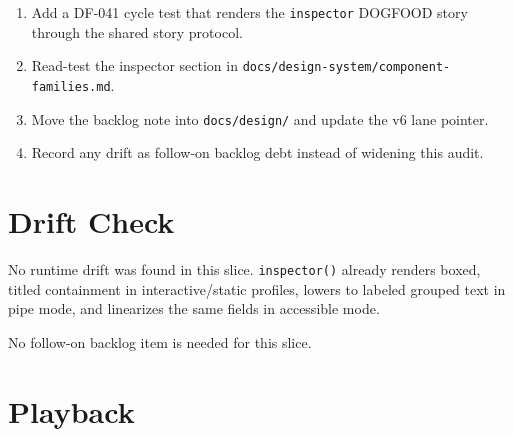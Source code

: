 \begin{enumerate}
\def\labelenumi{\arabic{enumi}.}
\tightlist
\item
  Add a DF-041 cycle test that renders the \texttt{i\allowbreak{}n\allowbreak{}s\allowbreak{}p\allowbreak{}e\allowbreak{}c\allowbreak{}t\allowbreak{}o\allowbreak{}r} DOGFOOD story through the shared story protocol.
\item
  Read-test the inspector section in \texttt{d\allowbreak{}o\allowbreak{}c\allowbreak{}s\allowbreak{}/\allowbreak{}d\allowbreak{}e\allowbreak{}s\allowbreak{}i\allowbreak{}g\allowbreak{}n\allowbreak{}-\allowbreak{}s\allowbreak{}y\allowbreak{}s\allowbreak{}t\allowbreak{}e\allowbreak{}m\allowbreak{}/\allowbreak{}c\allowbreak{}o\allowbreak{}m\allowbreak{}p\allowbreak{}o\allowbreak{}n\allowbreak{}e\allowbreak{}n\allowbreak{}t\allowbreak{}-\allowbreak{}f\allowbreak{}a\allowbreak{}m\allowbreak{}i\allowbreak{}l\allowbreak{}i\allowbreak{}e\allowbreak{}s\allowbreak{}.\allowbreak{}m\allowbreak{}d}.
\item
  Move the backlog note into \texttt{d\allowbreak{}o\allowbreak{}c\allowbreak{}s\allowbreak{}/\allowbreak{}d\allowbreak{}e\allowbreak{}s\allowbreak{}i\allowbreak{}g\allowbreak{}n\allowbreak{}/} and update the v6 lane pointer.
\item
  Record any drift as follow-on backlog debt instead of widening this audit.
\end{enumerate}

\section{Drift Check}\label{record-095-drift-check}

No runtime drift was found in this slice. \texttt{i\allowbreak{}n\allowbreak{}s\allowbreak{}p\allowbreak{}e\allowbreak{}c\allowbreak{}t\allowbreak{}o\allowbreak{}r\allowbreak{}(\allowbreak{})} already renders boxed, titled containment in interactive/static profiles, lowers to labeled grouped text in pipe mode, and linearizes the same fields in accessible mode.

No follow-on backlog item is needed for this slice.

\section{Playback}\label{record-095-playback}

